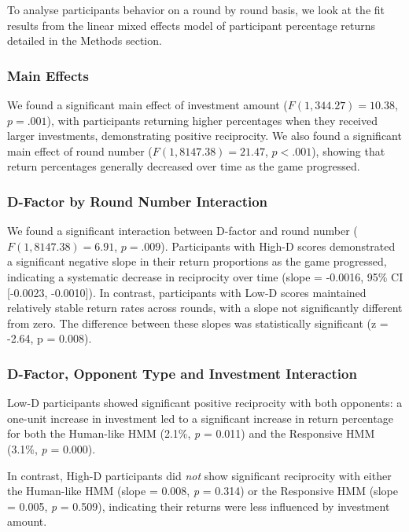 \documentclass[
]{article}
\begin{document}
To analyse participants behavior on a round by round basis, we look at the fit results from the linear mixed effects model of participant percentage returns detailed in the Methods section.

\subsubsection{Main Effects}\label{main-effects}

We found a significant main effect of investment amount (\(F(1, 344.27) = 10.38\), \(p = .001\)), with participants returning higher percentages when they received larger investments, demonstrating positive reciprocity. We also found a significant main effect of round number (\(F(1, 8147.38) = 21.47\), \(p < .001\)), showing that return percentages generally decreased over time as the game progressed.

\subsubsection{D-Factor by Round Number Interaction}\label{d-factor-by-round-number-interaction}

We found a significant interaction between D-factor and round number (\(F(1, 8147.38) = 6.91\), \(p = .009\)). Participants with High-D scores demonstrated a significant negative slope in their return proportions as the game progressed, indicating a systematic decrease in reciprocity over time (slope = -0.0016, 95\% CI {[}-0.0023, -0.0010{]}). In contrast, participants with Low-D scores maintained relatively stable return rates across rounds, with a slope not significantly different from zero. The difference between these slopes was statistically significant (z = -2.64, p = 0.008).

\subsubsection{D-Factor, Opponent Type and Investment Interaction}\label{d-factor-opponent-type-and-investment-interaction}

Low-D participants showed significant positive reciprocity with both opponents: a one-unit increase in investment led to a significant increase in return percentage for both the Human-like HMM (2.1\%, \emph{p} = 0.011) and the Responsive HMM (3.1\%, \emph{p} = 0.000).

In contrast, High-D participants did \emph{not} show significant reciprocity with either the Human-like HMM (slope = 0.008, \emph{p} = 0.314) or the Responsive HMM (slope = 0.005, \emph{p} = 0.509), indicating their returns were less influenced by investment amount.
\end{document}
